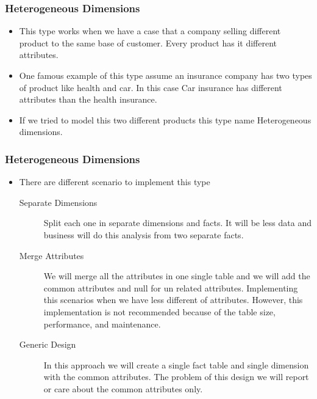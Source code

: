 \VideoClassification[column=1, colour=blue]
\begin{frame}
\frametitle{Heterogeneous Dimensions}
\begin{itemize}[<+->]
	
	\item This type works when we have a case that a company selling different product to the same base of customer. Every product has it different attributes. 
	\item One famous example of this type assume an insurance company has two types of product like health and car. In this case Car insurance has different attributes than the health insurance.
	\item If we tried to model this two different products this type name Heterogeneous dimensions. 
\end{itemize}
\end{frame}
\begin{frame}
	\frametitle{Heterogeneous Dimensions}
	\begin{itemize}[<+->]		
		\item There are different scenario to implement this type
		\begin{description}
			\item [Separate Dimensions] Split each one in separate dimensions and facts. It will be less data and business will do this analysis from two separate facts.
			\item [Merge Attributes] We will merge all the attributes in one single table and we will add the common attributes and null for un related attributes. Implementing this scenarios when we have less different of attributes. However, this implementation is not recommended because of the table size, performance, and maintenance.
			\item [Generic Design] In this approach we will create a single fact table and single dimension with the common attributes. The problem of this design we will report or care about the common attributes only.
		\end{description}		
\end{itemize}
\end{frame}



